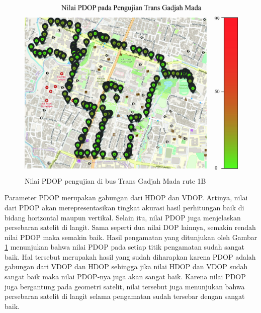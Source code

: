 \begin{figure}[H]
	\centering
	\includegraphics[width=12cm]{contents/chapter-4/pengujian-bergerak/moving-PDOP.jpg}
	\caption{Nilai PDOP pengujian di bus Trans Gadjah Mada rute 1B}
	\label{Fig: moving-pdop}
\end{figure}

Parameter PDOP merupakan gabungan dari HDOP dan VDOP. Artinya, nilai dari PDOP akan merepresentasikan tingkat akurasi hasil perhitungan baik di bidang horizontal maupun vertikal. Selain itu, nilai PDOP juga menjelaskan persebaran satelit di langit. Sama seperti dua nilai DOP lainnya, semakin rendah nilai PDOP maka semakin baik. Hasil pengamatan yang ditunjukan oleh Gambar \ref{Fig: moving-pdop} menunjukan bahwa nilai PDOP pada setiap titik pengamatan sudah sangat baik. Hal tersebut merupakah hasil yang sudah diharapkan karena PDOP adalah gabungan dari VDOP dan HDOP sehingga jika nilai HDOP dan VDOP sudah sangat baik maka nilai PDOP-nya juga akan sangat baik. Karena nilai PDOP juga bergantung pada geometri satelit, nilai tersebut juga menunjukan bahwa persebaran satelit di langit selama pengamatan sudah tersebar dengan sangat baik. 

